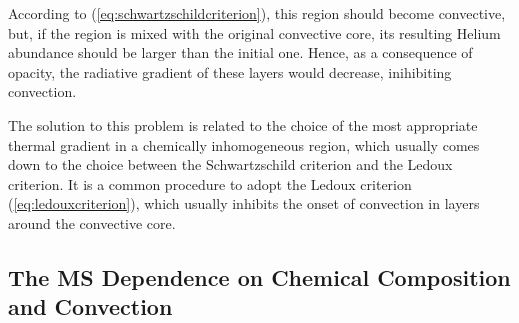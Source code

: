 \par According to (\ref{eq:schwartzschildcriterion}), this region should become convective, but, if the region is mixed with the original convective core, its resulting Helium abundance should be larger than the initial one. Hence, as a consequence of opacity, the radiative gradient of these layers would decrease, inihibiting convection.
\par The solution to this problem is related to the choice of the most appropriate thermal gradient in a chemically inhomogeneous region, which usually comes down to the choice between the Schwartzschild criterion and the Ledoux criterion. It is a common procedure to adopt the Ledoux criterion (\ref{eq:ledouxcriterion}), which usually inhibits the onset of convection in layers around the convective core.

\subsection{The MS Dependence on Chemical Composition and Convection}

